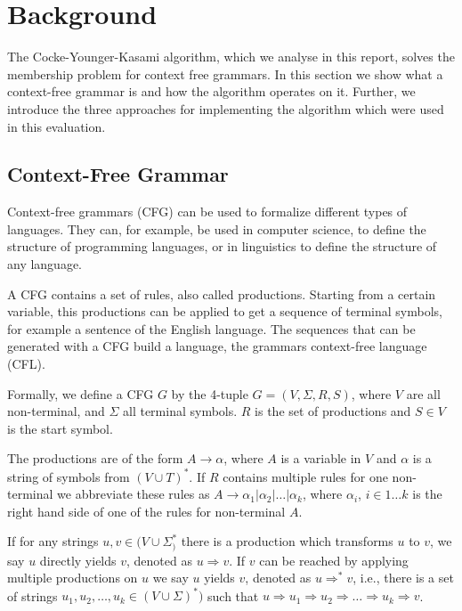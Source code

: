 \section{Background}

The Cocke-Younger-Kasami algorithm, which we analyse in this report, solves the membership problem for context free grammars.
In this section we show what a context-free grammar is and how the algorithm operates on it.
Further, we introduce the three approaches for implementing the algorithm which were used in this evaluation.

\subsection{Context-Free Grammar}

Context-free grammars (CFG) can be used to formalize different types of languages.
They can, for example, be used in computer science, to define the structure of programming languages, or in linguistics to define the structure of any language.

A CFG contains a set of rules, also called productions.
Starting from a certain variable, this productions can be applied to get a sequence of terminal symbols, for example a sentence of the English language.
The sequences that can be generated with a CFG build a language, the grammars context-free language (CFL).

Formally, we define a CFG $G$ by the 4-tuple $G=(V,\Sigma,R,S)$, where $V$ are all non-terminal, and $\Sigma$ all terminal symbols.
$R$ is the set of productions and $S\in V$ is the start symbol.

The productions are of the form $A\rightarrow\alpha$, where $A$ is a variable in $V$ and $\alpha$ is a string of symbols from $(V\cup T)^*$.
If $R$ contains multiple rules for one non-terminal we abbreviate these rules as $A\rightarrow \alpha_1 | \alpha_2 | \dots |\alpha_k $, where $\alpha_i$, $i\in {1\dots k}$ is the right hand side of one of the rules for non-terminal $A$.

If for any strings $u,v\in (V\cup \Sigma^*_)$ there is a production which transforms $u$ to $v$, we say $u$ directly yields $v$, denoted as $u\Rightarrow v$.
If $v$ can be reached by applying multiple productions on $u$ we say $u$ yields $v$, denoted as $u\Rightarrow^* v$, i.e., there is a set of strings $u_1, u_2, \dots, u_k\in (V\cup\Sigma)^*)$ such that $u\Rightarrow u_1 \Rightarrow u_2 \Rightarrow \dots \Rightarrow u_k \Rightarrow v$.

